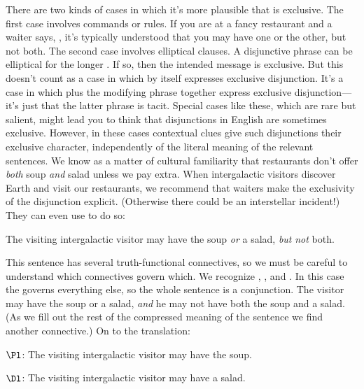   	There are two kinds of cases in which it's more plausible that  is exclusive.  
 	The first case involves commands or rules. 
 	If you are at a fancy restaurant and a waiter says, , it's typically understood that you may have one or the other, but not both. The second case involves elliptical clauses. 
 	A disjunctive phrase  can be elliptical for the longer . 
 	If so, then the intended message is exclusive. 
 	But this doesn't count as a case in which  by itself expresses exclusive disjunction. 
 	It's a case in which  plus the modifying phrase  together express exclusive disjunction---it's just that the latter phrase  is tacit. 
 	Special cases like these, which are rare but salient, might lead you to think that disjunctions in English are sometimes exclusive.  However, in these cases contextual clues give such disjunctions their exclusive character, independently of the literal meaning of the relevant sentences.  We know as a matter of cultural familiarity that restaurants don't offer \emph{both} soup \emph{and} salad unless we pay extra.  When intergalactic visitors discover Earth and visit our restaurants, we recommend that waiters make the exclusivity of the disjunction explicit.  (Otherwise there could be an interstellar incident!)  They can even use \GSL{} to do so:
 	
 \begin{menumerate}
 	\item The visiting intergalactic visitor may have the soup \emph{or} a salad, \emph{but} \emph{not} both.
 \end{menumerate}
 	
\noindent{}This sentence has several truth-functional connectives, so we must be careful to understand which connectives govern which.  We recognize , , and .  In this case the  governs everything else, so the whole sentence is a conjunction.  The visitor may have the soup or a salad, \emph{and} he may not have both the soup and a salad.  (As we fill out the rest of the compressed meaning of the sentence we find another connective.)  On to the translation:

	\begin{description}[itemsep=0em]
		\item[Translation Key:] \hfill{} 
		\begin{description}[itemsep=0em]
			\item $\Pl$: The visiting intergalactic visitor may have the soup.
			\item $\Dl$: The visiting intergalactic visitor may have a salad.
		\end{description} 
	\end{description}

